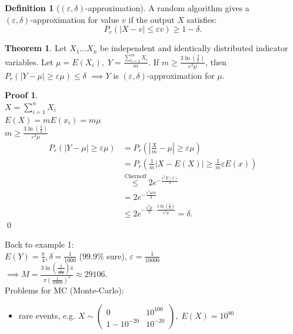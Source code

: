 \documentclass[a4paper, 12pt]{book}
\theoremstyle{definition}
\newtheorem{defn}[counter]{Definition}
\newtheorem{theorem}[counter]{Theorem}
\newtheorem{pro}[counter]{Proof}
\theoremstyle{remark}
\begin{document}
\begin{defn}[$(\varepsilon,\delta)$-approximation]
  A random algorithm gives a \\
  $(\varepsilon,\delta)$-approximation for value $v$ if the output $X$ satisfies:
  \begin{equation*}
    P_r\left(|X-v| \leq \varepsilon v\right) \geq 1 - \delta.
  \end{equation*}
\end{defn}
\begin{theorem}
  Let $X_1 \dots X_n$ be independent and identically distributed indicator variables.
  Let $\mu = E(X_i), \; Y = \frac{\sum_{i=1}^{m} X_i}{m}$.
  If $m \geq \frac{3 \ln\left(\frac{2}{\delta}\right)}{\varepsilon^2 \mu}$, then
  $P_r\left(|Y-\mu| \geq \varepsilon \mu\right) \leq \delta$
  $\implies Y$ is $(\varepsilon,\delta)$-approximation for $\mu$.
\end{theorem}
\begin{pro} \text{} \\
  $X = \sum_{i=1}^{n} X_i$ \\
  $E(X) = m E(x_i) = m \mu$ \\
  $m \geq \frac{3 \ln\left(\frac{2}{\delta}\right)}{\varepsilon^2 \mu}$
  \begin{align*}
    P_r\left(|Y-\mu| \geq \varepsilon \mu\right) &= P_r\left(\left|\frac{X}{m}-\mu\right| \geq \varepsilon \mu\right) \\
    &= P_r\left(\frac{1}{m} \left|X-E(X)\right| \geq \frac{1}{m} \varepsilon E(x)\right) \\
    &\stackrel{\text{Chernoff}}{\leq} 2 e^{-\frac{\varepsilon^2 E(x)}{3}} \\
    &= 2 e^{-\frac{\varepsilon^2 \mu m}{3}} \\
    &\leq 2 e^{-\frac{\varepsilon^2 \mu}{3} \cdot \frac{3 \ln\left(\frac{2}{\delta}\right)}{\varepsilon^2 \mu}} = \delta.
  \end{align*}
  \qed
\end{pro}
Back to example 1: \\
$E(Y) = \frac{\pi}{4}, \delta = \frac{1}{1000}$ ($99.9\%$ sure), $\varepsilon = \frac{1}{10000}$ \\
$\implies M = \frac{3 \ln\left(\frac{2}{\frac{1}{1000}}\right) 4}{\pi \left(\frac{1}{10000}\right)^2} \approx 29106$. \\
Problems for MC (Monte-Carlo):
\begin{itemize}
  \item rare events, e.g. $X \sim \begin{pmatrix}0 & 10^{100} \\ 1-10^{-20} & 10^{-20}\end{pmatrix}, \; E(X) = 10^{80}$
\end{itemize}
\end{document}
